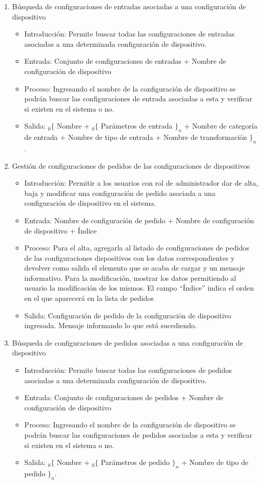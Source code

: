 \begin{enumerate}
			\item Búsqueda de configuraciones de entradas asociadas a una configuración de dispositivo
				\begin{itemize}
					\item Introducción: Permite buscar todas las configuraciones de entradas asociadas a una determinada configuración de dispositivo.
					\item Entrada: Conjunto de configuraciones de entradas + Nombre de configuración de dispositivo
					\item Proceso: Ingresando el nombre de la configuración de dispositivo se podrán buscar las configuraciones de entrada asociadas a esta y verificar si existen en el sistema o no.
					\item Salida: ${}_{0}\{$ Nombre + ${}_{0}\{$ Parámetros de entrada $\}_n$ + Nombre de categoría de entrada + Nombre de tipo de entrada + Nombre de transformación $\}_n$.
				\end{itemize}

			\item Gestión de configuraciones de pedidos de las configuraciones de dispositivos
				\begin{itemize}
					\item Introducción: Permitir a los usuarios con rol de administrador dar de alta, baja y modificar una configuración de pedido asociada a una configuración de dispositivo en el sistema.
					\item Entrada: Nombre de configuración de pedido + Nombre de configuración de dispositivo + Índice
					\item Proceso: Para el alta, agregarla al listado de configuraciones de pedidos de las configuraciones dispositivos con los datos correspondientes y devolver como salida el elemento que se acaba de cargar y un mensaje informativo.
					Para la modificación, mostrar los datos permitiendo al usuario la modificación de los mismos.
					El campo ``Índice'' indica el orden en el que aparecerá en la lista de pedidos
					\item Salida: Configuración de pedido de la configuración de dispositivo ingresada. Mensaje informando lo que está sucediendo.
				\end{itemize}
				
			\item Búsqueda de configuraciones de pedidos asociadas a una configuración de dispositivo
				\begin{itemize}
					\item Introducción: Permite buscar todas las configuraciones de pedidos asociadas a una determinada configuración de dispositivo.
					\item Entrada: Conjunto de configuraciones de pedidos + Nombre de configuración de dispositivo
					\item Proceso: Ingresando el nombre de la configuración de dispositivo se podrán buscar las configuraciones de pedidos asociadas a esta y verificar si existen en el sistema o no.
					\item Salida: ${}_{0}\{$  Nombre + ${}_{0}\{$ Parámetros de pedido $\}_n$ + Nombre de tipo de pedido $\}_n$.
				\end{itemize}


\end{enumerate}
